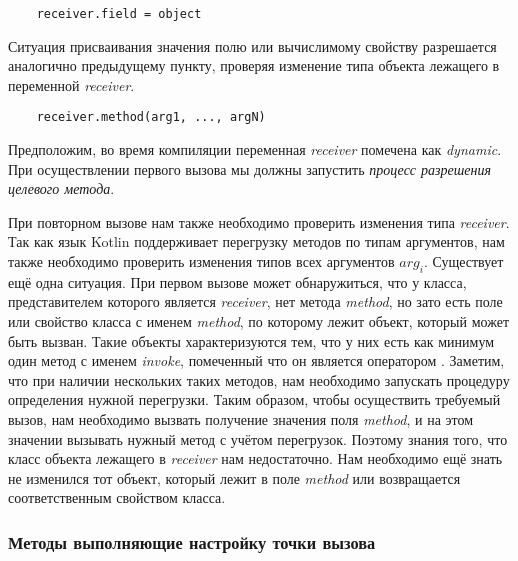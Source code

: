 \begin{verbatim}
    receiver.field = object
\end{verbatim}

Ситуация присваивания значения полю или вычислимому свойству разрешается аналогично предыдущему пункту, проверяя изменение типа объекта лежащего в переменной \textit{receiver}.

\begin{verbatim}
    receiver.method(arg1, ..., argN)
\end{verbatim}

Предположим, во время компиляции переменная \textit{receiver} помечена как \textit{dynamic}. При осуществлении первого
вызова мы должны запустить \textit{процесс разрешения целевого метода}.

При повторном вызове нам также необходимо проверить изменения типа  \textit{receiver}. Так как язык Kotlin поддерживает перегрузку методов по типам аргументов, нам также необходимо проверить изменения типов всех аргументов $arg_i$. Существует ещё одна ситуация. При первом вызове может обнаружиться, что у класса, представителем которого является \textit{receiver}, нет метода \textit{method}, но зато есть поле или свойство класса с именем \textit{method}, по которому лежит объект, который может быть вызван. Такие объекты характеризуются тем, что у них есть как минимум один метод с именем \textit{invoke}, помеченный что он является оператором \cite{book:jemerov2017kotlininAction}. Заметим, что при наличии нескольких таких методов, нам необходимо запускать процедуру определения нужной перегрузки. Таким образом, чтобы осуществить требуемый вызов, нам необходимо вызвать получение значения поля \textit{method}, и на этом значении вызывать нужный метод с учётом перегрузок. Поэтому знания того, что класс объекта лежащего в \textit{receiver} нам недостаточно. Нам необходимо ещё знать не изменился тот объект, который лежит в поле \textit{method} или возвращается соответственным свойством класса.




\subsubsection{Методы выполняющие настройку точки вызова}

